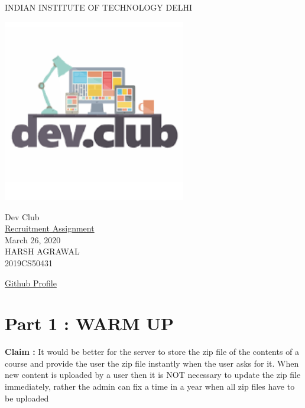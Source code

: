 \documentclass[12pt]{article}
\begin{document}
    \begin{titlepage}
        \centering
        \Large INDIAN INSTITUTE OF TECHNOLOGY DELHI\\[1.0 cm]
        \begin{center}
            \includegraphics[width=0.6\textwidth]{24647729.png}
        \end{center}
        
        \LARGE Dev Club\\[0.1cm]
        \Large \underline{Recruitment Assignment}\\[1cm]
        \Large March 26, 2020 \\[1cm]
        \Large HARSH AGRAWAL \\[0.2cm]
        \large 2019CS50431 \\[2cm]
        \begin{flushright}
            \large \href{https://github.com/Harsh14901}{Github Profile}
        \end{flushright}
        
    \end{titlepage}
\section{Part 1 : WARM UP}
\textbf{Claim :} It would be better for the server to store the zip file of the contents of a course and provide the user the zip file instantly when the user asks for it.
When new content is uploaded by a user then it is NOT necessary to update the zip file immediately, rather the admin can fix a time in a year when all zip files have to be uploaded \\[0.2cm]
\end{document}
